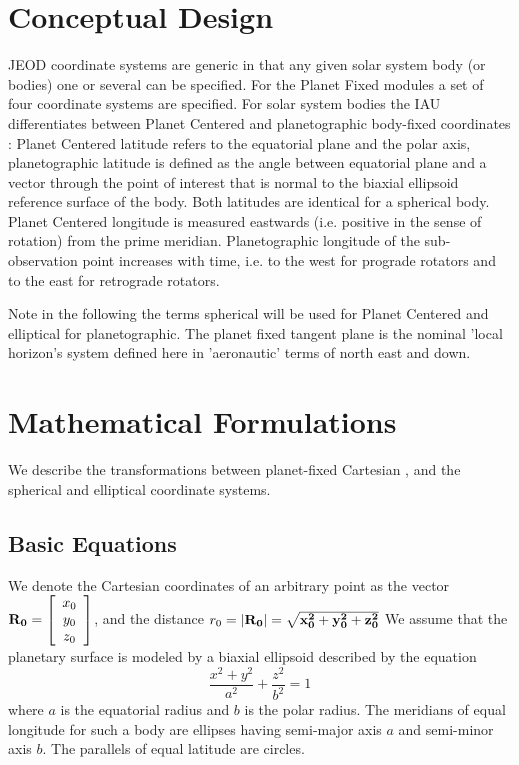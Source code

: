 \documentclass[twoside,11pt,titlepage]{report}
\begin{document}
\section{Conceptual Design}
JEOD coordinate systems are generic in that any given solar system body (or bodies) one or several can be specified.
For the Planet Fixed modules a set of four coordinate systems are specified.
For solar system bodies the IAU differentiates between Planet Centered and planetographic body-fixed coordinates : Planet Centered latitude refers to the equatorial plane and the polar axis, planetographic latitude is defined as the angle between equatorial plane and a vector through the point of interest that is normal to the biaxial ellipsoid reference surface of the body. Both latitudes are identical for a spherical body. Planet Centered longitude is measured eastwards (i.e. positive in the sense of rotation) from the prime meridian. Planetographic longitude of the sub-observation point increases with time, i.e. to the west for prograde rotators and to the east for retrograde rotators.

Note in the following the terms spherical will be used for Planet Centered and elliptical for planetographic. The planet
fixed tangent plane is the nominal 'local horizon's system defined here in 'aeronautic' terms of north east and down.

\section{Mathematical Formulations}
We describe the transformations between planet-fixed Cartesian , and the spherical and elliptical coordinate systems.

\subsection{Basic Equations}
We denote the Cartesian coordinates
of an arbitrary point as the vector  $\bf{R_0} = \left[\begin{array}{c}x_0 \\ y_0 \\z_0\end{array}\right]$,
and the distance $r_0 = |\bf{R_0}| = \sqrt{x_0^2+y_0^2+z_0^2}$
We assume that the planetary surface is modeled by a biaxial ellipsoid described by the equation
\begin{equation}
\frac{x^2+y^2}{a^2} + \frac{z^2}{b^2} = 1
\label{spheroid}
\end{equation}
\noindent where $a$ is the equatorial radius and $b$ is the polar radius.  The meridians of equal longitude  for such a body are ellipses having semi-major axis $a$ and semi-minor axis $b$. The parallels of equal latitude are circles.
\end{document}
